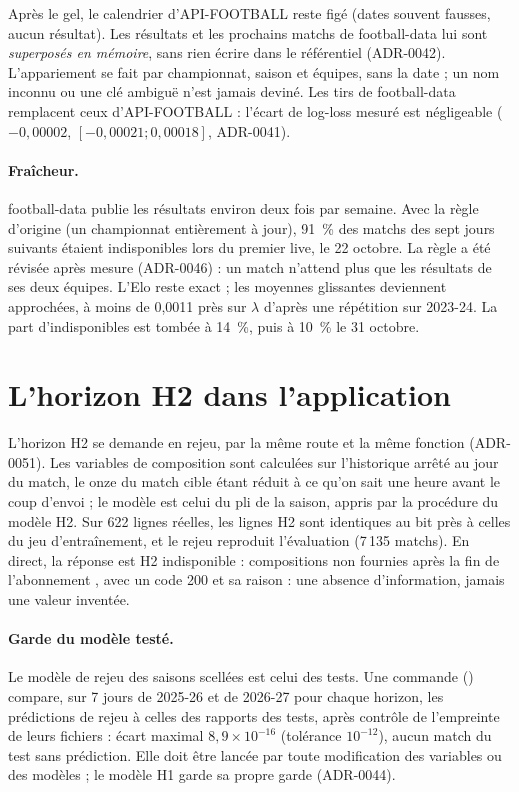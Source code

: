 Après le gel, le calendrier d'API-FOOTBALL reste figé (dates souvent fausses, aucun résultat). Les
résultats et les prochains matchs de football-data lui sont \emph{superposés en mémoire}, sans rien
écrire dans le référentiel (ADR-0042). L'appariement se fait par championnat, saison et équipes, sans la
date ; un nom inconnu ou une clé ambiguë n'est jamais deviné. Les tirs de football-data remplacent ceux
d'API-FOOTBALL : l'écart de log-loss mesuré est négligeable (\(-0{,}00002\), \([-0{,}00021 ; 0{,}00018]\),
ADR-0041).

\paragraph{Fraîcheur.} football-data publie les résultats environ deux fois par semaine. Avec la règle
d'origine (un championnat entièrement à jour), 91~\% des matchs des sept jours suivants étaient
indisponibles lors du premier live, le 22 octobre. La règle a été révisée après mesure (ADR-0046) : un
match n'attend plus que les résultats de ses deux équipes. L'Elo reste exact ; les moyennes glissantes
deviennent approchées, à moins de 0,0011 près sur \(\lambda\) d'après une répétition sur 2023-24. La part
d'indisponibles est tombée à 14~\%, puis à 10~\% le 31 octobre.

\section{L'horizon H2 dans l'application}

L'horizon H2 se demande en rejeu, par la même route et la même fonction (ADR-0051). Les variables de
composition sont calculées sur l'historique arrêté au jour du match, le onze du match cible étant réduit à
ce qu'on sait une heure avant le coup d'envoi ; le modèle est celui du pli de la saison, appris par la
procédure du modèle H2. Sur 622 lignes réelles, les lignes H2 sont identiques au bit près à celles du jeu
d'entraînement, et le rejeu reproduit l'évaluation (7\,135 matchs). En direct, la réponse est
\og H2 indisponible : compositions non fournies après la fin de l'abonnement \fg{}, avec un code 200 et sa
raison : une absence d'information, jamais une valeur inventée.

\paragraph{Garde du modèle testé.} Le modèle de rejeu des saisons scellées est celui des tests. Une commande
() compare, sur 7 jours de 2025-26 et de 2026-27 pour chaque
horizon, les prédictions de rejeu à celles des rapports des tests, après contrôle de l'empreinte de leurs
fichiers : écart maximal \(8{,}9 \times 10^{-16}\) (tolérance \(10^{-12}\)), aucun match du test sans
prédiction. Elle doit être lancée par toute modification des variables ou des modèles ; le modèle H1 garde sa
propre garde (ADR-0044).


